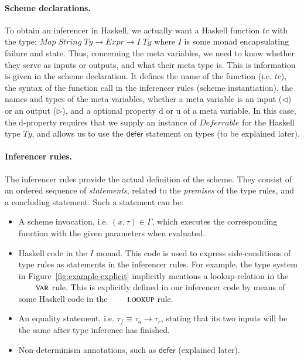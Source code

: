 \documentclass[preprint,natbib]{sigplanconf}
\newcommand{\Conid}[1]{\mathit{#1}}
\newcommand{\Varid}[1]{\mathit{#1}}
\newcommand\Defer{\mathsf{defer}}
\newcommand\typeofinput{\lhd}
\newcommand\typeofoutput{\rhd}
\begin{document}
\paragraph{Scheme declarations.}  To obtain an inferencer in Haskell,
we actually want a Haskell function \ensuremath{\Varid{tc}} with the type: \ensuremath{\Conid{Map}\;\Conid{String}\;\Conid{Ty}\to \Conid{Expr}\to \Conid{I}\;\Conid{Ty}} where \ensuremath{\Conid{I}} is some monad encapsulating failure and
state. Thus, concerning the meta variables, we need to know whether
they serve as inputs or outputs, and what their meta type is. This is
information is given in the scheme declaration. It defines the name of
the function (i.e. \ensuremath{\Varid{tc}}), the syntax of the function call in the
inferencer rules (scheme instantiation), the names and types of the
meta variables, whether a meta variable is an input ($\typeofinput$)
or an output ($\typeofoutput$), and a optional property $\mbox{d}$ or
$\mbox{u}$ of a meta variable. In this case, the $\mbox{d}$-property
requires that we supply an instance of \ensuremath{\Conid{Deferrable}} for the Haskell
type \ensuremath{\Conid{Ty}}, and allows us to use the $\Defer$ statement on types (to be
explained later).

\paragraph{Inferencer rules.}  The inferencer rules provide the actual
definition of the scheme. They consist of an ordered sequence of {\it
statements}, related to the {\it premises} of the type rules, and a
concluding statement. Such a statement can be:

\begin{itemize}
    \item A scheme invocation, i.e. $(x, \tau) \in \Gamma$, which executes the corresponding function with the given parameters when evaluated.
    \item Haskell code in the \ensuremath{\Conid{I}} monad. This code is used to express side-conditions of type rules as statements
          in the inferencer rules. For example, the type system in Figure~\ref{fig:example-explicit} implicitly mentions a
          lookup-relation in the $\RefTirName{VAR}$ rule. This is explicitly defined in our inferencer code by means of some Haskell code
          in the $\RefTirName{LOOKUP}$ rule.
    \item An equality statement, i.e. $\tau_f \equiv \tau_a \rightarrow \tau_r$, stating that its two inputs will be the same after type
          inference has finished.
    \item Non-determinism annotations, such as $\Defer$ (explained later).
\end{itemize}
\end{document}
